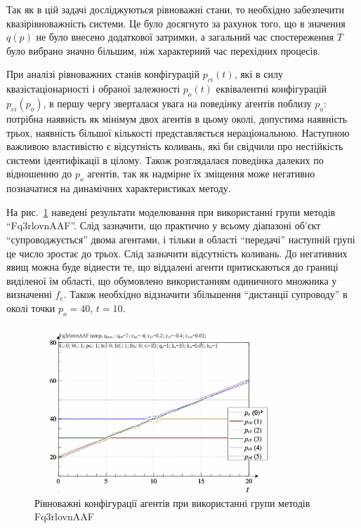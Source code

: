 Так як в цій задачі досліджуються рівноважні стани, то
необхідно забезпечити квазірівноважність системи. Це було
досягнуто за рахунок того, що в значення
$q(p)$ не було внесено додаткової затримки, а загальний час
спостереження
$T$ було вибрано значно більшим, ніж характерний час
перехідних процесів.

При аналізі рівноважних станів конфігурацій
$ p_{ci} (t) $, які в силу квазістаціонарності і обраної залежності
$ p_o (t) $ еквівалентні конфігурацій
$ p_{ci} (p_o) $, в першу чергу зверталася увага на поведінку агентів
поблизу
$p_o$: потрібна наявність як мінімум двох агентів в цьому околі,
допустима наявність трьох, наявність більшої кількості
представляється нераціональною. Наступною важливою властивістю
є відсутність коливань, які би свідчили про нестійкість системи
ідентифікації в цілому. Також розглядалася поведінка далеких
по відношенню до
$ p_o $ агентів, так як надмірне їх зміщення може негативно
позначатися на динамічних характеристиках методу.

На рис.~\ref{atu:f:qls_ramp_Fq3rlovnAAF} наведені результати моделювання при використанні групи методів
``Fq3rlovnAAF''. Слід зазначити, що практично у всьому діапазоні об'єкт
``супроводжується'' двома агентами, і тільки в області ``передачі'' наступній
групі це число зростає до трьох. Слід зазначити відсутність коливань. До
негативних явищ можна буде віднести те, що віддалені агенти притискаються до
границі виділеної їм області, що обумовлено використанням одиничного множника у
визначенні $f_e$. Також необхідно відзначити збільшення
``дистанції супроводу'' в околі точки $p_o = 40$, $t = 10$.

\begin{figure}[htb!]
  \begin{center}
    \includegraphics[width=0.8\textwidth]{p/ramp/qls-p_t_pi_Fq3rlovnAAF_ramp.png}
  \end{center}
  \caption{Рівноважні конфігурації агентів при використанні групи методів Fq3rlovnAAF}
  \label{atu:f:qls_ramp_Fq3rlovnAAF}
\end{figure}

